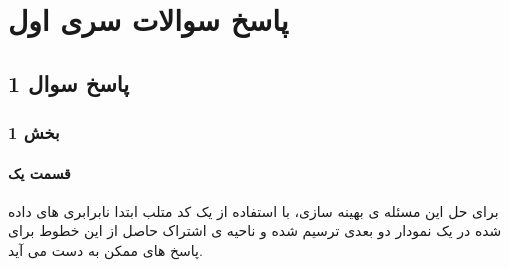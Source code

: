 
\chapter{پاسخ سوالات سری اول}

\section{ پاسخ سوال 1}

\subsection{بخش 1}

\subsubsection{قسمت یک}
برای حل این مسئله ی بهینه سازی، با استفاده از یک کد متلب ابتدا نابرابری های داده شده در یک نمودار دو بعدی ترسیم شده و ناحیه ی اشتراک حاصل از این خطوط  برای پاسخ های ممکن به دست می آید.

